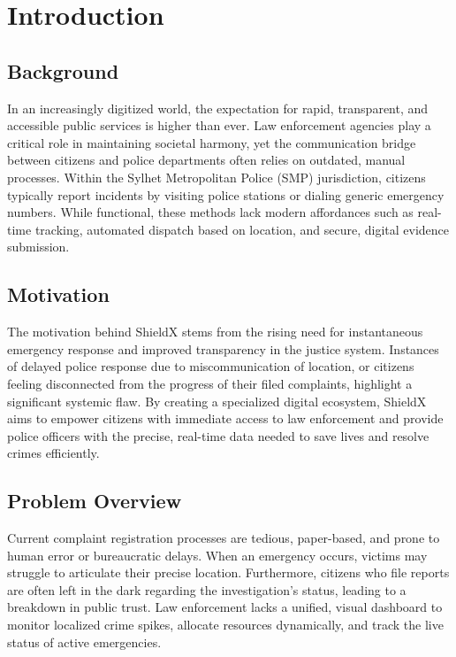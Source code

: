 \documentclass[11pt, a4paper]{report}
\begin{document}

\chapter{Introduction}

\section{Background}
In an increasingly digitized world, the expectation for rapid, transparent, and accessible public services is higher than ever. Law enforcement agencies play a critical role in maintaining societal harmony, yet the communication bridge between citizens and police departments often relies on outdated, manual processes. Within the Sylhet Metropolitan Police (SMP) jurisdiction, citizens typically report incidents by visiting police stations or dialing generic emergency numbers. While functional, these methods lack modern affordances such as real-time tracking, automated dispatch based on location, and secure, digital evidence submission.

\section{Motivation}
The motivation behind ShieldX stems from the rising need for instantaneous emergency response and improved transparency in the justice system. Instances of delayed police response due to miscommunication of location, or citizens feeling disconnected from the progress of their filed complaints, highlight a significant systemic flaw. By creating a specialized digital ecosystem, ShieldX aims to empower citizens with immediate access to law enforcement and provide police officers with the precise, real-time data needed to save lives and resolve crimes efficiently.

\section{Problem Overview}
Current complaint registration processes are tedious, paper-based, and prone to human error or bureaucratic delays. When an emergency occurs, victims may struggle to articulate their precise location. Furthermore, citizens who file reports are often left in the dark regarding the investigation's status, leading to a breakdown in public trust. Law enforcement lacks a unified, visual dashboard to monitor localized crime spikes, allocate resources dynamically, and track the live status of active emergencies.
\end{document}
